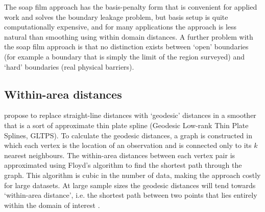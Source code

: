 \documentclass[smallextended]{svjour3}       %
\begin{document}
The soap film approach has the basis-penalty form that is convenient for applied work and solves the boundary leakage problem, but basis setup is quite computationally expensive, and for many applications the approach is less natural than smoothing using within domain distances. A further problem with the soap film approach is that no distinction exists between `open' boundaries (for example a boundary that is simply the limit of the region surveyed) and `hard' boundaries (real physical barriers).

\subsection{Within-area distances}

\cite{Wang:2007tf} propose to replace straight-line distances with `geodesic' distances in a smoother that is a sort of approximate thin plate spline (Geodesic Low-rank Thin Plate Splines, GLTPS). To calculate the geodesic distances, a graph is constructed in which each vertex is the location of an observation and is connected only to its $k$ nearest neighbours. The within-area distances between each vertex pair is approximated using  Floyd's algorithm \citep{Floyd:1962:A9S:367766.368168} to find the shortest path through the graph. This algorithm is cubic in the number of data, making the approach costly for large datasets. At large sample sizes the geodesic distances will tend towards `within-area distance', i.e. the shortest path between two points that lies entirely within the domain of interest \citep{Bernstein:2000tp}.
\end{document}
